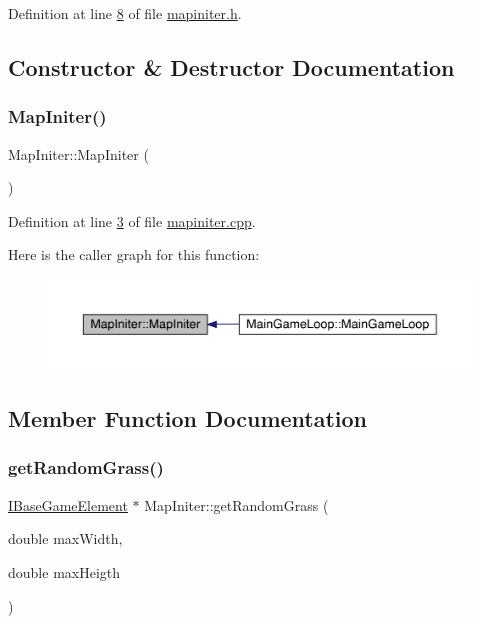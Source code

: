 Definition at line \hyperlink{a00098_source_l00008}{8} of file \hyperlink{a00098_source}{mapiniter.\+h}.



\subsection{Constructor \& Destructor Documentation}
\mbox{\label{a00217_a1137dec968988621ea18091fdf379987}} 
\subsubsection{\texorpdfstring{Map\+Initer()}{MapIniter()}}
{\footnotesize\ttfamily Map\+Initer\+::\+Map\+Initer (\begin{DoxyParamCaption}{ }\end{DoxyParamCaption})}



Definition at line \hyperlink{a00095_source_l00003}{3} of file \hyperlink{a00095_source}{mapiniter.\+cpp}.

Here is the caller graph for this function\+:
\nopagebreak
\begin{figure}[H]
\begin{center}
\leavevmode
\includegraphics[width=350pt]{df/d24/a00217_a1137dec968988621ea18091fdf379987_icgraph}
\end{center}
\end{figure}


\subsection{Member Function Documentation}
\mbox{\label{a00217_a8961b80aa1df5f628bd4e28e66a51d0b}} 
\subsubsection{\texorpdfstring{get\+Random\+Grass()}{getRandomGrass()}}
{\footnotesize\ttfamily \hyperlink{a00137}{I\+Base\+Game\+Element} $\ast$ Map\+Initer\+::get\+Random\+Grass (\begin{DoxyParamCaption}\item[{double}]{max\+Width,  }\item[{double}]{max\+Heigth }\end{DoxyParamCaption})\hspace{0.3cm}{\ttfamily [protected]}}



